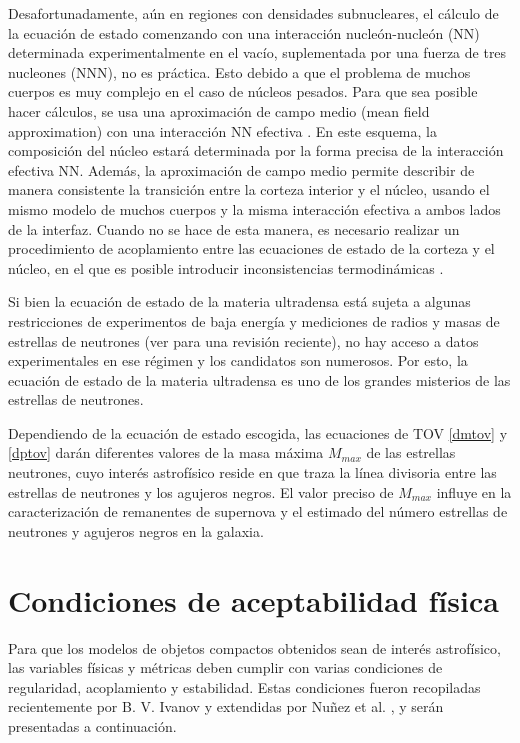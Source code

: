 Desafortunadamente, aún en regiones con densidades subnucleares, el cálculo de la ecuación de estado comenzando con una interacción nucleón-nucleón (NN) determinada experimentalmente en el vacío, suplementada por una fuerza de tres nucleones (NNN), no es práctica. Esto debido a que el problema de muchos cuerpos es muy complejo en el caso de núcleos pesados. Para que sea posible hacer cálculos, se usa una aproximación de campo medio (mean field approximation) con una interacción NN efectiva \cite{Douchin2001AStructure}. En este esquema, la composición del núcleo estará determinada por la forma precisa de la interacción efectiva NN.
Además, la aproximación de campo medio permite describir de manera consistente la transición entre la corteza interior y el núcleo, usando el mismo modelo de muchos cuerpos y la misma interacción efectiva a ambos lados de la interfaz. Cuando no se hace de esta manera, es necesario realizar un procedimiento de acoplamiento entre las ecuaciones de estado de la corteza y el núcleo, en el que es posible introducir inconsistencias termodinámicas \cite{Fortin2016NeutronState}. 

Si bien la ecuación de estado de la materia ultradensa está sujeta a algunas restricciones de experimentos de baja energía y mediciones de radios y masas de estrellas de neutrones (ver \cite{Ozel2016} para una revisión reciente), no hay acceso a datos experimentales en ese régimen y los candidatos son numerosos. Por esto, la ecuación de estado de la materia ultradensa es uno de los grandes misterios de las estrellas de neutrones. 

Dependiendo de la ecuación de estado escogida, las ecuaciones de TOV \eqref{dmtov} y \eqref{dptov} darán diferentes valores de la masa máxima $M_{max}$ de las estrellas neutrones, cuyo interés astrofísico reside en que traza la línea divisoria entre las estrellas de neutrones y los agujeros negros. El valor preciso de $M_{max}$ influye en la caracterización de remanentes de supernova y el estimado del número estrellas de neutrones y agujeros negros en la galaxia. 

\section{Condiciones de aceptabilidad física}
Para que los modelos de objetos compactos obtenidos sean de interés astrofísico, las variables físicas y métricas deben cumplir con varias condiciones de regularidad, acoplamiento y estabilidad. Estas condiciones fueron recopiladas recientemente por B. V. Ivanov \cite{Ivanov2017} y extendidas por Nuñez et al. \cite{Hernandez2018}, y serán presentadas a continuación. 


